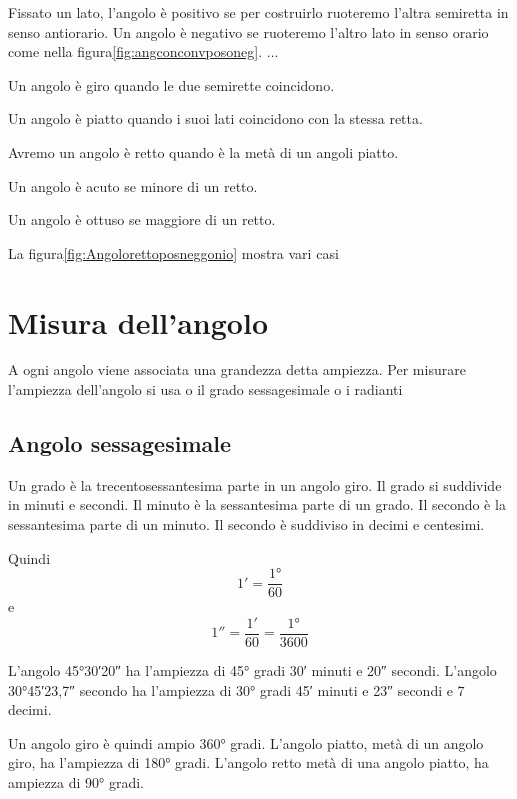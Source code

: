\begin{definizione}
	Fissato un lato, l'angolo è  positivo  se per costruirlo ruoteremo l'altra semiretta in senso antiorario.  Un angolo è negativo se ruoteremo l'altro lato in senso orario come nella figura\nobs\vref{fig:angconconvposoneg}. ...
\end{definizione}
\begin{definizione}
Un angolo è giro quando le due semirette coincidono. 
\end{definizione}
\begin{definizione}
Un angolo è  piatto quando i suoi lati  coincidono con la stessa retta.
\end{definizione}
\begin{definizione}
Avremo un angolo è retto quando è la metà di un angoli piatto. 
\end{definizione}
\begin{definizione}
Un angolo è acuto se  minore di un  retto.
\end{definizione}
\begin{definizione}
Un angolo è ottuso se  maggiore di un  retto.
\end{definizione}
 La figura\nobs\vref{fig:Angolorettoposneggonio} mostra  vari casi
\section{Misura dell'angolo}
\label{sec:MisuraAngoloGonio}

A ogni angolo viene associata una grandezza detta ampiezza.  Per misurare l'ampiezza dell'angolo si usa o il grado sessagesimale  o i radianti
\subsection{Angolo sessagesimale}
\begin{definizione}[Grado]
Un grado è la trecentosessantesima parte in un angolo giro. Il grado si suddivide in minuti e  secondi. Il minuto è la sessantesima parte di un grado. Il secondo è la sessantesima parte di un minuto. Il secondo è suddiviso in decimi e centesimi.
\end{definizione}
 Quindi \[\ang{;1;}=\dfrac{\ang{1}}{60}\] e  \[\ang{;;1}=\dfrac{\ang{;1;}}{60}=\dfrac{\ang{1}}{3600}\]
\begin{esempio}
L'angolo  \ang{45;30;20}  ha l'ampiezza di \ang{45} gradi \ang{;30;} minuti e \ang{;;20} secondi. L'angolo \ang{30;45;23,7} secondo ha l'ampiezza di \ang{30} gradi \ang{;45;} minuti e \ang{;;23} secondi e $7$ decimi.
\end{esempio}
Un angolo giro è quindi ampio \ang{360} gradi. L'angolo piatto,  metà di un angolo giro, ha l'ampiezza di \ang{180} gradi. L'angolo retto  metà di una angolo piatto, ha ampiezza di \ang{90} gradi.

